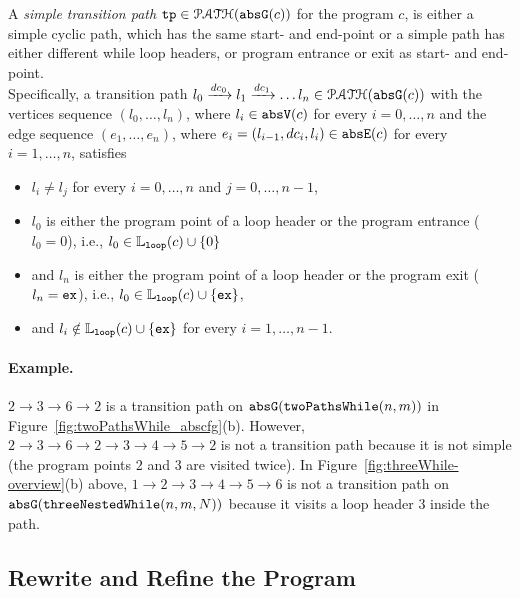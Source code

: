 \begin{defn}
  \label{def:tpath}
A \emph{simple transition path}
$\mathtt{tp} \in \mathcal{PATH}(\mathtt{abs}{\mathtt{G}}(c))$ for the program $c$, is either a simple cyclic path, which has the same start- and end-point
or a simple path has either different while loop headers, or program entrance or exit as start- and end-point.
\\
Specifically, a transition path $l_0 \xrightarrow{dc_0} l_1 \xrightarrow{dc_1} \ldots l_n \in \mathcal{PATH}(\mathtt{abs}{\mathtt{G}}(c))$ with the
vertices sequence $(l_0, \ldots, l_n)$, where $l_i \in \mathtt{abs}{\mathtt{V}}(c)$ for every $i = 0, \ldots, n$ and
%
the edge sequence $(e_1, \ldots, e_n)$, where $e_i = (l_{i - 1}, dc_i, l_{i}) \in \mathtt{abs}{\mathtt{E}}(c)$ for every $i = 1, \ldots, n$,
%
satisfies
\begin{itemize}
  \item $l_i \neq l_j$ for every $i = 0, \ldots, n$ and $j = 0, \ldots, {n - 1}$,
  \item $l_0$ is either the program point of a loop header or the program entrance ($l_0 = 0$),
  i.e., $l_0 \in \mathbb{L}_{\mathtt{loop}}(c) \cup \{ 0 \}$
  \item and $l_n$ is either the program point of a loop header or the program exit ($l_n = \mathtt{ex}$),
  i.e., $l_0 \in \mathbb{L}_{\mathtt{loop}}(c) \cup \{ \mathtt{ex} \}$,
  \item and $l_i \notin \mathbb{L}_{\mathtt{loop}}(c) \cup \{ \mathtt{ex} \}$ for every $i = 1, \ldots, n-1$.
\end{itemize}
\end{defn}

\paragraph{Example.}
$2 \to 3 \to 6 \to 2$ is a transition path on $\mathtt{abs}{\mathtt{G}}(\mathtt{twoPathsWhile}(n, m))$ in Figure~\ref{fig:twoPathsWhile_abscfg}(b).
However, $2 \to 3 \to 6 \to 2 \to 3 \to 4 \to 5 \to 2$ is not a transition path because it is not simple (the program points $2$ and $3$ are visited twice).
In Figure~\ref{fig:threeWhile-overview}(b) above, $1 \to 2 \to 3 \to 4 \to 5 \to 6$ is not a transition path on $\mathtt{abs}{\mathtt{G}}(\mathtt{threeNestedWhile}(n, m, N))$ because it visits a loop header $3$ inside the path.

\subsection{Rewrite and Refine the Program}
